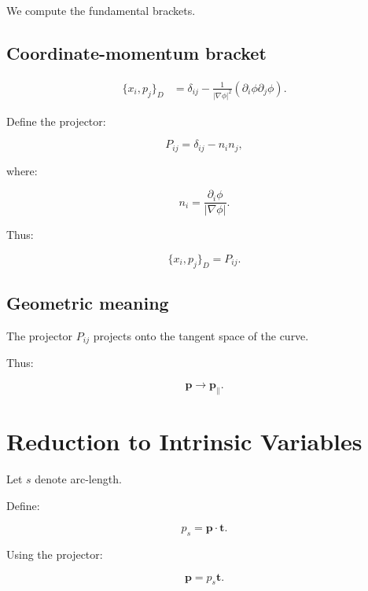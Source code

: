 \documentclass[11pt]{article}
\begin{document}
We compute the fundamental brackets.

\subsection{Coordinate-momentum bracket}

\begin{align}
\{x_i, p_j\}_D
&= \delta_{ij}
- \frac{1}{|\nabla\phi|^2}
\left(
\partial_i \phi \partial_j \phi
\right).
\end{align}

Define the projector:

\begin{equation}
P_{ij} = \delta_{ij} - n_i n_j,
\end{equation}

where:

\begin{equation}
n_i = \frac{\partial_i \phi}{|\nabla\phi|}.
\end{equation}

Thus:

\begin{equation}
\{x_i, p_j\}_D = P_{ij}.
\end{equation}

\subsection{Geometric meaning}

The projector $P_{ij}$ projects onto the tangent space of the curve.

Thus:

\begin{equation}
\mathbf{p} \to \mathbf{p}_{\parallel}.
\end{equation}

\section{Reduction to Intrinsic Variables}

Let $s$ denote arc-length.

Define:

\begin{equation}
p_s = \mathbf{p} \cdot \mathbf{t}.
\end{equation}

Using the projector:

\begin{equation}
\mathbf{p} = p_s \mathbf{t}.
\end{equation}
\end{document}
